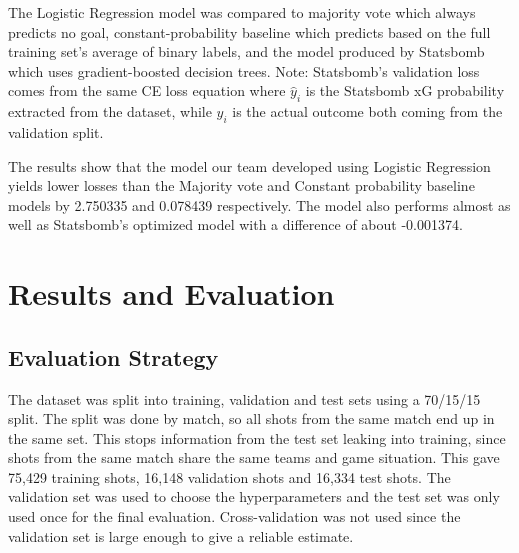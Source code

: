 \documentclass[11pt]{article}
\begin{document}
The Logistic Regression model was compared to majority vote which always predicts no goal, constant-probability baseline which predicts based on the full training set's average of binary labels, and the model produced by Statsbomb which uses gradient-boosted decision trees. Note: Statsbomb's validation loss comes from the same CE loss equation where \(\hat{y}_i\) is the Statsbomb xG probability extracted from the dataset, while \(y_i\) is the actual outcome both coming from the validation split.

\begin{table}[H]
\centering
{}
\caption{Training and validation cross-entropy losses for the logistic regression, majority-class baseline, constant-probability baseline, and StatsBomb xG.}
\label{tab:validation-loss}
\end{table}

The results show that the model our team developed using Logistic Regression yields lower losses than the Majority vote and Constant probability baseline models by 2.750335 and 0.078439 respectively. The model also performs almost as well as Statsbomb's optimized model with a difference of about -0.001374.

 \section{Results and Evaluation}
  \label{sec:results}

  \subsection{Evaluation Strategy}

  The dataset was split into training, validation and test sets using a 70/15/15 split. The split was done by match, so all shots from the same match end up in the
  same set. This stops information from the test set leaking into training, since shots from the same match share the same teams and game situation. This gave 75,429
  training shots, 16,148 validation shots and 16,334 test shots. The validation set was used to choose the hyperparameters and the test set was only used once for
  the final evaluation. Cross-validation was not used since the validation set is large enough to give a reliable estimate.
\end{document}
